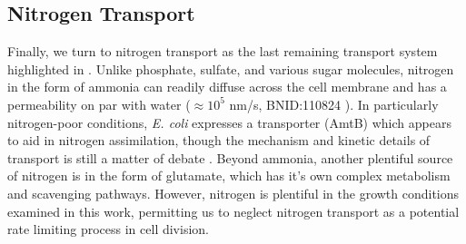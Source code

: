\subsection{Nitrogen Transport}
Finally, we turn to nitrogen transport as the last remaining transport system
highlighted in . Unlike phosphate, sulfate, and various sugar
molecules, nitrogen in the form of ammonia can readily diffuse across the
cell membrane and has a permeability on par with water ($\approx 10^5$ nm/s,
BNID:110824 \cite{milo2010}). In particularly nitrogen-poor
conditions, \textit{E. coli} expresses a transporter (AmtB) which appears to aid in
nitrogen assimilation, though the mechanism and kinetic details of transport
is still a matter of debate \citep{heeswijk2013a, khademi2004}. Beyond ammonia,
another plentiful source of nitrogen is in the form of glutamate, which has it's
own complex metabolism and scavenging pathways. However, nitrogen is plentiful
in the growth conditions examined in this work, permitting us to neglect
nitrogen transport as a potential rate limiting process in cell division.
